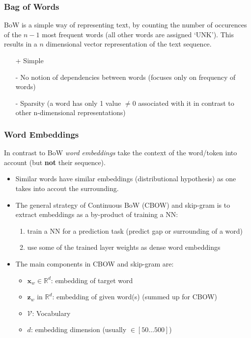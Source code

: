 \subsubsection{Bag of Words}
BoW is a simple way of representing text, by counting the number of occurences of the $n-1$ most frequent words (all other words are assigned `UNK').
This results in a $n$ dimensional vector representation of the text sequence.
\begin{itemize}
    \item [+] Simple
    \item [-] No notion of dependencies between words (focuses only on frequency of words)
    \item [-] Sparsity (a word has only 1 value $\neq 0$ associated with it in contrast to other n-dimensional representations)
\end{itemize}
\subsubsection{Word Embeddings}
In contrast to BoW \textit{word embeddings} take the context of the word/token into account (but \textbf{not} their sequence).
\begin{itemize}
    \item Similar words have similar embeddings (distributional hypothesis) as one takes into accout the surrounding.
    \item The general strategy of Continuous BoW (CBOW) and skip-gram is to extract embeddings as a by-product of training a NN:
          \begin{enumerate}
              \item train a NN for a prediction task (predict gap or surrounding of a word)
              \item use some of the trained layer weights as dense word embeddings
          \end{enumerate}
    \item The main components in CBOW and skip-gram are:
          \begin{itemize}
              \item $\mathbf{x}_w \in \mathbb{R}^d$: embedding of target word
              \item $\mathbf{z} _w$ in $\mathbb{R}^d$: embedding of given word(s) (summed up for CBOW)
              \item $\mathcal{V}$: Vocabulary
              \item $d$: embedding dimension (usually $\in [50\dots500]$)
          \end{itemize}
\end{itemize}

